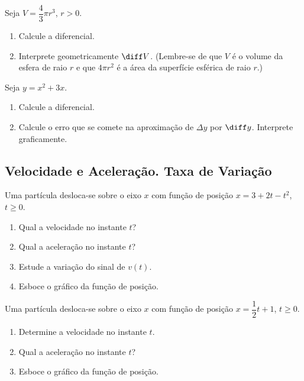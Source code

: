 \begin{exercicio}[3]
\label{ex:7.14.3}
Seja $V = \dfrac{4}{3}\pi r^3$, $r > 0$.
\begin{enumerate}[label=\alph*)]
    \item Calcule a diferencial.
    \item Interprete geometricamente $\diff V$. (Lembre-se de que $V$ é o volume da esfera de raio $r$ e que $4\pi r^2$ é a área da superfície esférica de raio $r$.)
\end{enumerate}
\end{exercicio}

\begin{exercicio}[4]
\label{ex:7.14.4}
Seja $y = x^2 + 3x$.
\begin{enumerate}[label=\alph*)]
    \item Calcule a diferencial.
    \item Calcule o erro que se comete na aproximação de $\Delta y$ por $\diff y$. Interprete graficamente.
\end{enumerate}
\end{exercicio}

\clearpage

\subsection{Velocidade e Aceleração. Taxa de Variação}

\begin{exercicio}[1]
\label{ex:7.15.1}
Uma partícula desloca-se sobre o eixo $x$ com função de posição $x = 3 + 2t - t^2$, $t \ge 0$.
\begin{enumerate}[label=\alph*)]
    \item Qual a velocidade no instante $t$?
    \item Qual a aceleração no instante $t$?
    \item Estude a variação do sinal de $v(t)$.
    \item Esboce o gráfico da função de posição.
\end{enumerate}
\end{exercicio}

\begin{exercicio}[2]
\label{ex:7.15.2}
Uma partícula desloca-se sobre o eixo $x$ com função de posição $x = \dfrac{1}{2}t + 1$, $t \ge 0$.
\begin{enumerate}[label=\alph*)]
    \item Determine a velocidade no instante $t$.
    \item Qual a aceleração no instante $t$?
    \item Esboce o gráfico da função de posição.
\end{enumerate}
\end{exercicio}

